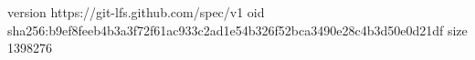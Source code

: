 version https://git-lfs.github.com/spec/v1
oid sha256:b9ef8feeb4b3a3f72f61ac933c2ad1e54b326f52bca3490e28c4b3d50e0d21df
size 1398276
